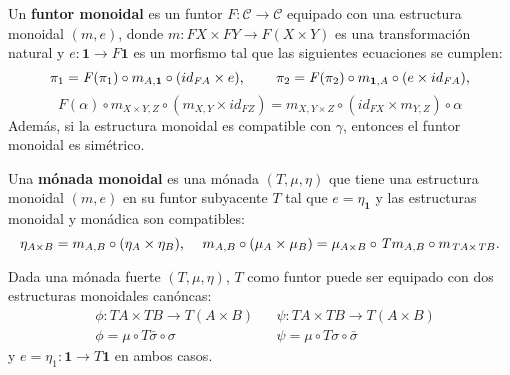 \begin{definition}\label{def:monoidalfuntor}
Un \textbf{funtor monoidal} es un funtor $\mathit{F}: \mathscr{C} \rightarrow \mathscr{C}$ equipado con una estructura monoidal $(m,e)$, donde $m : \mathit{F} X \times \mathit{F} Y \rightarrow \mathit{F} (X \times Y)$ es una transformación natural y $e : \mathbf
{1} \rightarrow \mathit{F} \mathbf{1}$ es un morfismo tal que las siguientes ecuaciones se cumplen:
\begin{equation*}
\pi_1 = \mathit{F}(\pi_1) \circ m_{A,\mathbf{1}} \circ (id_{\mathit{F}A} \times e) \text{, \qquad} \pi_2 = \mathit{F}(\pi_2) \circ m_{\mathbf{1},A} \circ (e \times id_{\mathit{F}A}) \text{,}
\end{equation*}
\begin{equation*}
\mathit{F}(\alpha) \circ m_{X \times Y, Z} \circ (m_{X,Y} \times id_{\mathit{F}Z}) = m_{X, Y \times Z} \circ (id_{\mathit{F}X} \times m_{Y,Z}) \circ \alpha
\end{equation*}
Además, si la estructura monoidal es compatible con $\gamma$, entonces el funtor monoidal es simétrico.
\end{definition}

\begin{definition}
Una \textbf{mónada monoidal} es una mónada $(\textit{T},\mu,\eta)$ que tiene una estructura monoidal $(m,e)$ en su funtor subyacente $\mathit{T}$ tal que $e = \eta_{\mathbf{1}}$ y las estructuras monoidal y monádica son compatibles:
\begin{equation*}
\eta_{A \times B} = m_{A,B} \circ (\eta_A \times \eta_B) \text{, \quad} m_{A,B} \circ (\mu_A \times \mu_B) = \mu_{A \times B} \circ \mathit{T}m_{A,B} \circ m_{\mathit{T}A \times \mathit{T}B}.
\end{equation*}
\end{definition}

Dada una mónada fuerte $(\mathit{T},\mu,\eta)$, $\mathit{T}$ como funtor puede ser equipado con dos estructuras monoidales canóncas:
\begin{align*}
&\phi : \mathit{T}A \times \mathit{T}B \rightarrow \mathit{T} (A \times B) & &\psi : \mathit{T}A \times \mathit{T}B \rightarrow \mathit{T}(A \times B) \\
&\phi = \mu \circ \mathit{T}\bar{\sigma} \circ \sigma & &\psi = \mu \circ \mathit{T}\sigma \circ \bar{\sigma}
\end{align*}
y $e = \eta_1 : \mathbf{1} \rightarrow \mathit{T}\mathbf{1}$ en ambos casos. 

